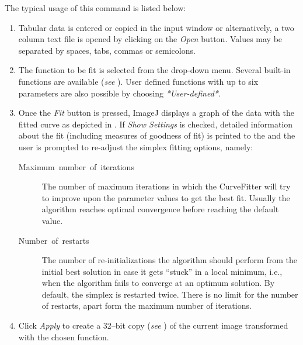 The typical usage of this command is listed below:
\begin{enumerate}
\item Tabular data is entered or copied in the input window or alternatively,
a two column text file is opened by clicking on the \emph{Open} button.
Values may be separated by spaces, tabs, commas or semicolons.
\item The function to be fit is selected from the drop-down menu. Several
built-in functions are available (\emph{see} ).
User defined functions with up to six parameters are also possible
by choosing \emph{{*}User-defined{*}.}
\item Once the \emph{Fit} button is pressed, ImageJ displays a graph of
the data with the fitted curve as depicted in .
If \emph{Show Settings }is checked, detailed information about the
fit (including measures of goodness of fit) is printed to the 
and the user is prompted to re-adjust the simplex fitting options,
namely:

\begin{description}
\item [{Maximum\ number\ of\ iterations}] The number of maximum iterations
in which the CurveFitter will try to improve upon the parameter values
to get the best fit. Usually the algorithm reaches optimal convergence
before reaching the default value.
\item [{Number\ of\ restarts}] The number of re-initializations the algorithm
should perform from the initial best solution in case it gets ``stuck''
in a local minimum, i.e., when the algorithm fails to converge at
an optimum solution. By default, the simplex is restarted twice. There
is no limit for the number of restarts, apart form the maximum number
of iterations.
\end{description}
\item Click \emph{Apply} to create a 32--bit copy (\emph{see} )
of the current image transformed with the chosen function.
\end{enumerate}
%
